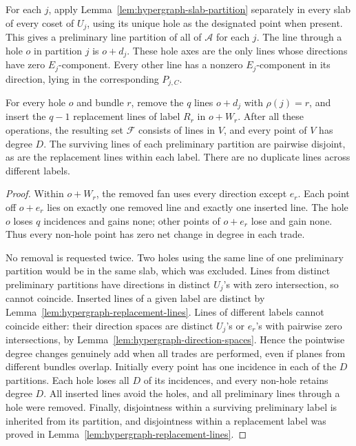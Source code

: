 For each $j$, apply Lemma~\ref{lem:hypergraph-slab-partition}
separately in every slab of every coset of $U_j$, using its unique
hole as the designated point when present.  This gives a preliminary
line partition of all of $\mathcal A$ for each $j$.  The line through
a hole $o$ in partition $j$ is $o+d_j$.  These hole axes are the only
lines whose directions have zero $E_j$-component.  Every other line
has a nonzero $E_j$-component in its direction, lying in the
corresponding $P_{j,C}$.

\begin{lemma}\label{lem:hypergraph-trade}
For every hole $o$ and bundle $r$, remove the $q$ lines $o+d_j$ with
$\rho(j)=r$, and insert the $q-1$ replacement lines of label $R_r$
in $o+W_r$.  After all these operations, the resulting set
$\mathcal F$ consists of lines in $V$, and every point of $V$ has
degree $D$.  The surviving lines of each preliminary partition are
pairwise disjoint, as are the replacement lines within each label.
There are no duplicate lines across different labels.
\end{lemma}

\begin{proof}
Within $o+W_r$, the removed fan uses every direction except $e_r$.
Each point off $o+e_r$ lies on exactly one removed line and exactly
one inserted line.  The hole $o$ loses $q$ incidences and gains none;
other points of $o+e_r$ lose and gain none.  Thus every non-hole point
has zero net change in degree in each trade.

No removal is requested twice.  Two holes using the same line of
one preliminary partition would be in the same slab, which was
excluded.  Lines from distinct preliminary partitions have directions
in distinct $U_j$'s with zero intersection, so cannot coincide.
Inserted lines of a given label are distinct by
Lemma~\ref{lem:hypergraph-replacement-lines}.  Lines of different
labels cannot coincide either: their direction spaces are distinct
$U_j$'s or $e_r$'s with pairwise zero intersections, by
Lemma~\ref{lem:hypergraph-direction-spaces}.
Hence the pointwise degree changes genuinely add when all trades
are performed, even if planes from different bundles overlap.
Initially every point has one incidence in each of the $D$ partitions.
Each hole loses all $D$ of its incidences, and every non-hole retains
degree $D$.  All inserted lines avoid the holes, and all preliminary
lines through a hole were removed.  Finally, disjointness within a
surviving preliminary label is inherited from its partition, and
disjointness within a replacement label was proved in
Lemma~\ref{lem:hypergraph-replacement-lines}.
\end{proof}

